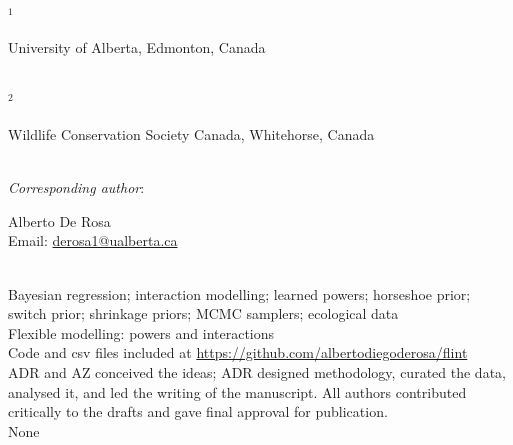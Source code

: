 \medskip
{}\\
\medskip
\noindent $^1$ \parbox[t]{13cm}{University of Alberta, Edmonton,  Canada} \\
\noindent $^2$ \parbox[t]{13cm}{Wildlife Conservation Society Canada, Whitehorse, Canada} \\
\vspace{2 cm}
\noindent \emph{Corresponding author}: \parbox[t]{13cm}{Alberto De Rosa\\
Email: \url{derosa1@ualberta.ca}}\\

\vspace{2.5cm}
 Bayesian regression; interaction modelling; learned powers; horseshoe prior; switch prior; shrinkage priors; MCMC samplers; ecological data\\
\medskip
{} Flexible modelling: powers and interactions\\ %
\medskip
{} Code and csv files included at \url{https://github.com/albertodiegoderosa/flint}\\
 ADR and AZ conceived the ideas; ADR designed methodology, curated the data, analysed it, and led the writing of the manuscript. All authors contributed critically to the drafts and gave final approval for publication.\\
 None \\

